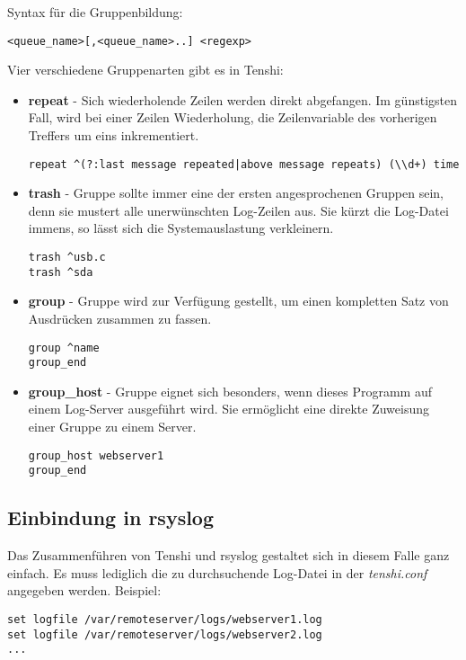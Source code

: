 Syntax für die Gruppenbildung:
\begin{lstlisting}
<queue_name>[,<queue_name>..] <regexp>
\end{lstlisting}

Vier verschiedene Gruppenarten gibt es in Tenshi:
\begin{itemize}
\item \textbf{repeat} - Sich wiederholende Zeilen werden direkt abgefangen. Im günstigsten Fall, wird bei einer Zeilen Wiederholung, die Zeilenvariable des vorherigen Treffers um eins inkrementiert.
\begin{lstlisting}
repeat ^(?:last message repeated|above message repeats) (\\d+) time
\end{lstlisting}
\item \textbf{trash} - Gruppe sollte immer eine der ersten angesprochenen Gruppen sein, denn sie mustert alle unerwünschten Log-Zeilen aus. Sie kürzt die Log-Datei immens, so lässt sich die Systemauslastung verkleinern.
\begin{lstlisting}  
trash ^usb.c 
trash ^sda
\end{lstlisting}
\item \textbf{group} - Gruppe wird zur Verfügung gestellt, um einen kompletten Satz von Ausdrücken zusammen zu fassen.
\begin{lstlisting}
group ^name
group_end
\end{lstlisting} 
\item \textbf{group\_host} - Gruppe eignet sich besonders, wenn dieses Programm auf einem Log-Server ausgeführt wird. Sie ermöglicht eine direkte Zuweisung einer Gruppe zu einem Server.
\begin{lstlisting}
group_host webserver1
group_end
\end{lstlisting}
\end{itemize}


\subsection{Einbindung in rsyslog}
Das Zusammenführen von Tenshi und rsyslog gestaltet sich in diesem Falle ganz einfach. Es muss lediglich die zu durchsuchende Log-Datei in der \textit{tenshi.conf} angegeben werden.
Beispiel:
\begin{lstlisting}
set logfile /var/remoteserver/logs/webserver1.log
set logfile /var/remoteserver/logs/webserver2.log
...
\end{lstlisting}

